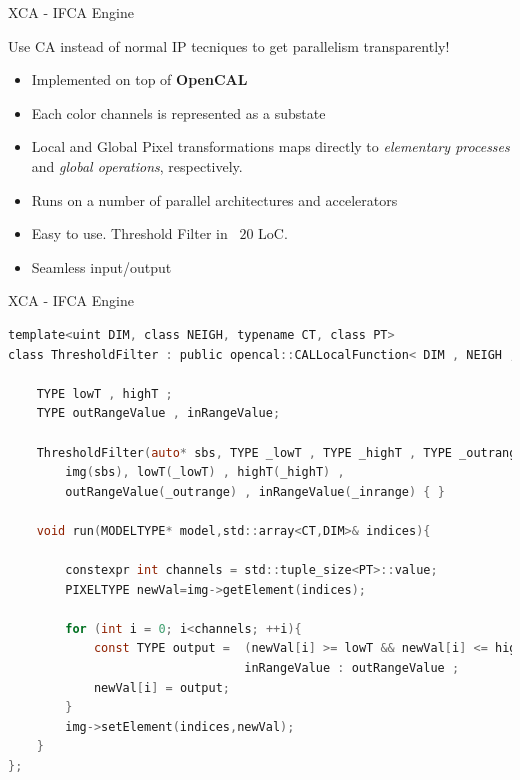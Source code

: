\documentclass{beamer}
\begin{document}
		\begin{frame}{XCA - IFCA Engine }
\begin{block}{Use CA instead of normal IP tecniques to get parallelism transparently!}
\end{block}		
		

		\begin{itemize}
			\item Implemented on top of \textbf{OpenCAL}
			\item Each color channels is represented as a substate
			\item Local and Global Pixel transformations maps directly to \textit{elementary processes} and \textit{global operations}, respectively.
			\item Runs on a number of parallel architectures and accelerators
			\item Easy to use. Threshold Filter in ~$20$ LoC.
			\item Seamless input/output
			\end{itemize}
		\end{frame}
		\begin{frame}[fragile]{XCA - IFCA Engine}
			 \begin{lstlisting}[language=C,basicstyle=\tiny\ttfamily]
template<uint DIM, class NEIGH, typename CT, class PT>
class ThresholdFilter : public opencal::CALLocalFunction< DIM , NEIGH , CT>{

    TYPE lowT , highT ;
    TYPE outRangeValue , inRangeValue;

    ThresholdFilter(auto* sbs, TYPE _lowT , TYPE _highT , TYPE _outrange, TYPE _inrange ):
        img(sbs), lowT(_lowT) , highT(_highT) , 
        outRangeValue(_outrange) , inRangeValue(_inrange) { }
    
    void run(MODELTYPE* model,std::array<CT,DIM>& indices){
        
        constexpr int channels = std::tuple_size<PT>::value;
        PIXELTYPE newVal=img->getElement(indices);

        for (int i = 0; i<channels; ++i){
            const TYPE output =  (newVal[i] >= lowT && newVal[i] <= highT) ?
            					 inRangeValue : outRangeValue ;
            newVal[i] = output;
        }
        img->setElement(indices,newVal);
    }
};			
			
	\end{lstlisting}
		\end{frame}		
		
\end{document}
